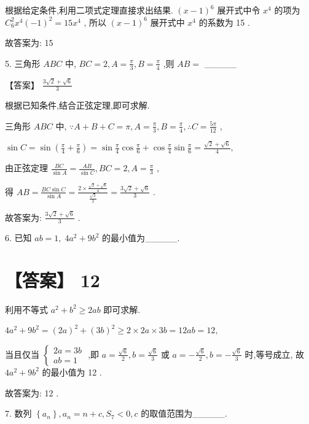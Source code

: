 \documentclass[10pt]{article}
\begin{document}
根据给定条件,利用二项式定理直接求出结果. \({\left( x - 1\right) }^{6}\) 展开式中令 \({x}^{4}\) 的项为 \({C}_{6}^{2}{x}^{4}{\left( -1\right) }^{2} = {15}{x}^{4}\) , 所以 \({\left( x - 1\right) }^{6}\) 展开式中 \({x}^{4}\) 的系数为 15 .

故答案为: 15

5. 三角形 \({ABC}\) 中, \({BC} = 2,A = \frac{\pi }{3},B = \frac{\pi }{4}\) ,则 \({AB} =\) \_\_\_\_\_

【答案】 \(\frac{3\sqrt{2} + \sqrt{6}}{3}\)

根据已知条件,结合正弦定理,即可求解.

三角形 \({ABC}\) 中, \(\because A + B + C = \pi ,A = \frac{\pi }{3},B = \frac{\pi }{4},\therefore C = \frac{5\pi }{12}\) ,

\(\sin C = \sin \left( {\frac{\pi }{4} + \frac{\pi }{6}}\right)  = \sin \frac{\pi }{4}\cos \frac{\pi }{6} + \cos \frac{\pi }{4}\sin \frac{\pi }{6} = \frac{\sqrt{2} + \sqrt{6}}{4},\)

由正弦定理 \(\frac{BC}{\sin A} = \frac{AB}{\sin C},{BC} = 2,A = \frac{\pi }{3}\) ,

得 \({AB} = \frac{{BC}\sin C}{\sin A} = \frac{2 \times  \frac{\sqrt{2} + \sqrt{6}}{4}}{\frac{\sqrt{3}}{2}} = \frac{3\sqrt{2} + \sqrt{6}}{3}\) .

故答案为: \(\frac{3\sqrt{2} + \sqrt{6}}{3}\) .

6. 已知 \({ab} = 1,\;4{a}^{2} + 9{b}^{2}\) 的最小值为\_\_\_\_\_.

\section*{【答案】 12}

利用不等式 \({a}^{2} + {b}^{2} \geq  {2ab}\) 即可求解.

\(4{a}^{2} + 9{b}^{2} = {\left( 2a\right) }^{2} + {\left( 3b\right) }^{2} \geq  2 \times  {2a} \times  {3b} = {12ab} = {12},\)

当且仅当 \(\left\{  \begin{array}{l} {2a} = {3b} \\  {ab} = 1 \end{array}\right.\) ,即 \(a = \frac{\sqrt{6}}{2},b = \frac{\sqrt{6}}{3}\) 或 \(a =  - \frac{\sqrt{6}}{2},b =  - \frac{\sqrt{6}}{3}\) 时,等号成立, 故 \(4{a}^{2} + 9{b}^{2}\) 的最小值为 12 .

故答案为: 12 .

7. 数列 \(\left\{  {a}_{n}\right\}  ,{a}_{n} = n + c,{S}_{7} < 0,c\) 的取值范围为\_\_\_\_\_.
\end{document}
